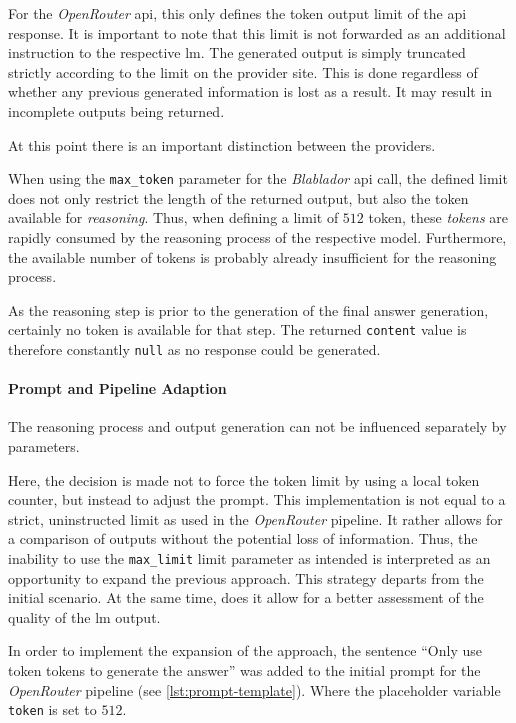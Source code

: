 For the \textit{OpenRouter} \ac{api}, this only defines the token output limit of the \ac{api} response.
It is important to note that this limit is not forwarded as an additional instruction to the respective \ac{lm}.
The generated output is simply truncated strictly according to the limit on the provider site.
This is done regardless of whether any previous generated information is lost as a result.
It may result in incomplete outputs being returned.

At this point there is an important distinction between the providers.

When using the \texttt{max\_token} parameter for the \textit{Blablador} \ac{api} call, the defined limit does not only restrict the length of the returned output, but also the token available for \textit{reasoning}.
Thus, when defining a limit of $512$ token, these \textit{tokens} are rapidly consumed by the reasoning process of the respective model.
Furthermore, the available number of tokens is probably already insufficient for the reasoning process.

As the reasoning step is prior to the generation of the final answer generation, certainly no token is available for that step.
The returned \texttt{content} value is therefore constantly \texttt{null} as no response could be generated.

\paragraph{Prompt and Pipeline Adaption}
The reasoning process and output generation can not be influenced separately by parameters.

Here, the decision is made not to force the token limit by using a local token counter, but instead to adjust the prompt.
This implementation is not equal to a strict, uninstructed limit as used in the \textit{OpenRouter} pipeline.
It rather allows for a comparison of outputs without the potential loss of information.
Thus, the inability to use the \texttt{max\_limit} limit parameter as intended is interpreted as an opportunity to expand the previous approach.
This strategy departs from the initial scenario.
At the same time, does it allow for a better assessment of the quality of the \ac{lm} output. 

In order to implement the expansion of the approach, the sentence \enquote{Only use {token} tokens to generate the answer} was added to the initial prompt for the \textit{OpenRouter} pipeline (see \cref{lst:prompt-template}).
Where the placeholder variable \texttt{{token}} is set to $512$.

